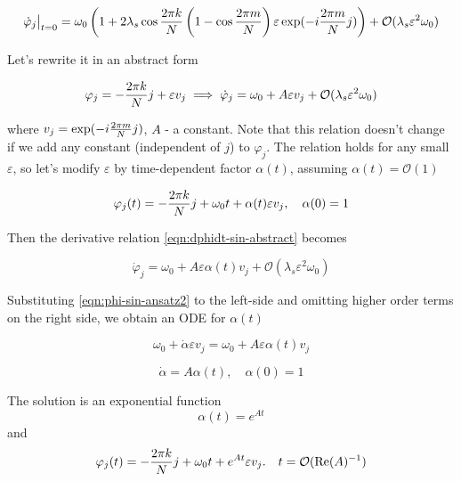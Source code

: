\documentclass[a4paper,10pt]{article}
\renewcommand*{\Re}{\operatorname{Re}}
\newcommand*{\eps}{\varepsilon}
\newcommand*{\bigO}{\mathcal{O}}
\begin{document}
\begin{equation}
\dot \varphi_j \big\rvert_{t=0} = 
\omega_0 \left( 1 +  2 \lambda_s  \co{k}{} \left(1 - \co{m}{} \right) \eps \exp( - i \fr{m}{j}) \right)  
+ \bigO(\lambda_s \eps ^2 \omega_0)
\end{equation}

Let's rewrite it in an abstract form

\begin{equation}
 \varphi_j = -  \fr{k}{j}  + \eps  v_j \implies 
\dot \varphi_j =  \omega_0 + A \eps  v_j + \bigO(\lambda_s \eps ^2 \omega_0)
\label{eqn:dphidt-sin-abstract}
\end{equation}

where $v_j =\exp( - i \frac{2 \pi m} {N} j)$, $A$ - a constant. Note that this relation doesn't change if we add any constant (independent of $j$) to $\varphi_j$. The relation holds for any small $\eps$, so let's modify $\eps$ by time-dependent factor $\alpha(t)$, assuming $\alpha(t) = \bigO(1)$

\begin{equation}
\varphi_j(t) = -  \fr{k}{j} + \omega_0 t + \alpha(t) \eps v_j, \quad \alpha(0) = 1
\label{eqn:phi-sin-ansatz2}
\end{equation}

Then the derivative relation \eqref{eqn:dphidt-sin-abstract} becomes

\begin{equation}
\dot \varphi_j  = \omega_0 + A \eps \alpha(t)  v_j + \bigO(\lambda_s \eps ^2  \omega_0)
\end{equation}

Substituting \eqref{eqn:phi-sin-ansatz2} to the left-side and omitting higher order terms on the right side, we obtain an ODE for $\alpha(t)$

\begin{equation}
\omega_0 + \dot \alpha \eps v_j  = \omega_0  + A \eps \alpha(t)  v_j 
\end{equation}

\begin{equation}
\dot \alpha  = A \alpha(t), \quad \alpha(0) = 1
\end{equation}

The solution is an exponential function
\begin{equation}
\alpha(t) = e^{A t}
\end{equation}
and 
\begin{equation}
\varphi_j(t)  =  -  \fr{k}{j} + \omega_0 t +  e^{A t}  \eps v_j.
\quad t = \bigO(\Re(A)^{-1})
\end{equation}
\end{document}
